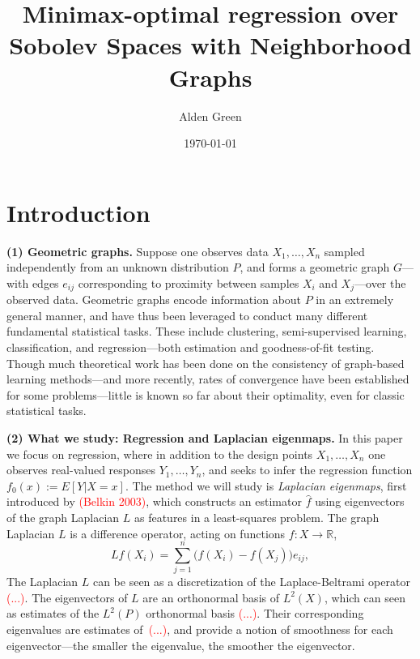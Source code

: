 \documentclass{article}
\newcommand{\Reals}{\mathbb{R}}
\newcommand{\1}{\mathbf{1}}
\newcommand{\wh}[1]{\widehat{#1}}
\theoremstyle{alden}
\theoremstyle{aldenthm}
\theoremstyle{definition}
\theoremstyle{remark}
\begin{document}
\title{Minimax-optimal regression over Sobolev Spaces with Neighborhood Graphs}
\author{Alden Green}
\date{\today}
\maketitle

\section{Introduction}
\label{sec:introduction}

\textbf{(1) Geometric graphs.} Suppose one observes data $X_1,\ldots,X_n$ sampled independently from an unknown distribution $P$, and forms a geometric graph $G$---with edges $e_{ij}$ corresponding to proximity between samples $X_i$ and $X_j$---over the observed data. Geometric graphs encode information about $P$ in an extremely general manner, and have thus been leveraged to conduct many different fundamental statistical tasks. These include clustering, semi-supervised learning, classification, and regression---both estimation and goodness-of-fit testing. Though much theoretical work has been done on the consistency of graph-based learning methods---and more recently, rates of convergence have been established for some problems---little is known so far about their optimality, even for classic statistical tasks. 

\textbf{(2) What we study: Regression and Laplacian eigenmaps.} In this paper we focus on regression, where in addition to the design points $X_1,\ldots,X_n$ one observes real-valued responses $Y_1,\ldots,Y_n$, and seeks to infer the regression function $f_0(x) := E[Y|X = x]$. The method we will study is \emph{Laplacian eigenmaps}, first introduced by \textcolor{red}{(Belkin 2003)}, which constructs an estimator $\wh{f}$ using eigenvectors of the graph Laplacian $L$ as features in a least-squares problem. The graph Laplacian $L$ is a difference operator, acting on functions $f: X \to \Reals$, 
\begin{equation}
\label{eqn:graph_laplacian}
Lf(X_i) = \sum_{j = 1}^{n} \bigl(f(X_i) - f(X_j)\bigr)e_{ij},
\end{equation}
The Laplacian $L$ can be seen as a discretization of the Laplace-Beltrami operator \textcolor{red}{(...)}. The eigenvectors of $L$ are an orthonormal basis of $L^2(X)$, which can seen as estimates of the $L^2(P)$ orthonormal basis \textcolor{red}{(...)}. Their corresponding eigenvalues  are estimates of~\textcolor{red}{(...)}, and provide a notion of smoothness for each eigenvector---the smaller the eigenvalue, the smoother the eigenvector. 
\end{document}
